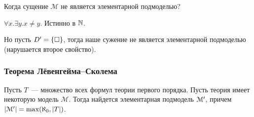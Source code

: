 \begin{example}
    Когда сущение $\mathcal{M}$ не является элементарной подмоделью?

    $\forall x.\exists y.x \neq y$. Истинно в $\mathbb{N}$.

    Но пусть $D^{\prime} = \{ \square \}$, тогда наше сужение не является элементарной подмоделью (нарушается второе свойство).
\end{example}
\subsubsection{Теорема Лёвенгейма--Сколема}
\begin{theorem}
    Пусть $T$~--- множество всех формул теории первого порядка. Пусть теория имеет некоторую модель $\mathcal M$. Тогда найдется элементарная подмодель $\mathcal{M}^{\prime}$, причем $\left| \mathcal M^{\prime} \right| = \max(\aleph_0,|T|)$.
\end{theorem}

